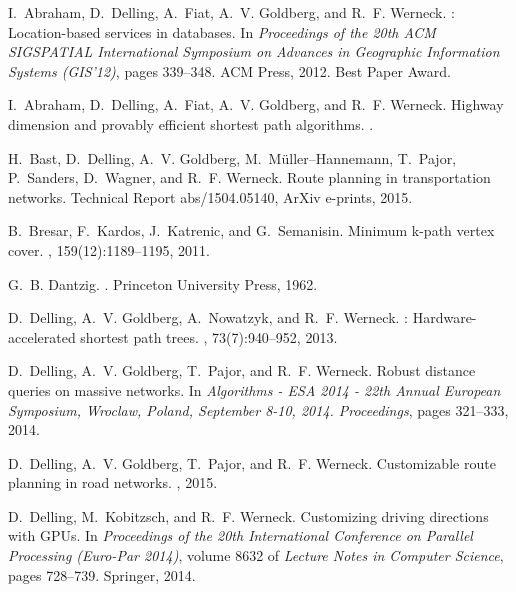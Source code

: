 \documentclass{sig-alternate}
\begin{document}
\begin{thebibliography}{10}

I.~Abraham, D.~Delling, A.~Fiat, A.~V. Goldberg, and R.~F. Werneck.
: Location-based services in databases.
\newblock In {\em Proceedings of the 20th ACM SIGSPATIAL International
  Symposium on Advances in Geographic Information Systems (GIS'12)}, pages
  339--348. ACM Press, 2012.
\newblock Best Paper Award.

I.~Abraham, D.~Delling, A.~Fiat, A.~V. Goldberg, and R.~F. Werneck.
\newblock Highway dimension and provably efficient shortest path algorithms.
.

H.~Bast, D.~Delling, A.~V. Goldberg, M.~{M{\"u}ller--Hannemann}, T.~Pajor,
  P.~Sanders, D.~Wagner, and R.~F. Werneck.
\newblock Route planning in transportation networks.
\newblock Technical Report abs/1504.05140, ArXiv e-prints, 2015.

B.~Bresar, F.~Kardos, J.~Katrenic, and G.~Semanisin.
\newblock Minimum k-path vertex cover.
, 159(12):1189--1195, 2011.

G.~B. Dantzig.
.
\newblock Princeton University Press, 1962.

D.~Delling, A.~V. Goldberg, A.~Nowatzyk, and R.~F. Werneck.
: Hardware-accelerated shortest path trees.
, 73(7):940--952,
  2013.

D.~Delling, A.~V. Goldberg, T.~Pajor, and R.~F. Werneck.
\newblock Robust distance queries on massive networks.
\newblock In {\em Algorithms - {ESA} 2014 - 22th Annual European Symposium,
  Wroclaw, Poland, September 8-10, 2014. Proceedings}, pages 321--333, 2014.

D.~Delling, A.~V. Goldberg, T.~Pajor, and R.~F. Werneck.
\newblock Customizable route planning in road networks.
, 2015.

D.~Delling, M.~Kobitzsch, and R.~F. Werneck.
\newblock Customizing driving directions with {GPU}s.
\newblock In {\em Proceedings of the 20th International Conference on Parallel
  Processing (Euro-Par 2014)}, volume 8632 of {\em Lecture Notes in Computer
  Science}, pages 728--739. Springer, 2014.


\end{thebibliography}
\end{document}
